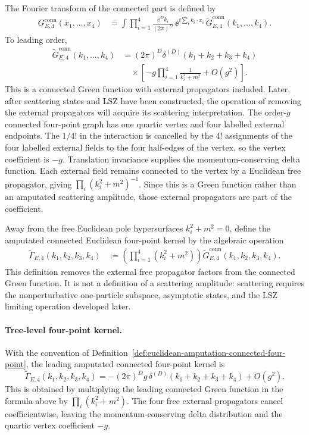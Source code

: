 The Fourier transform of the connected part is defined by
\[
\begin{aligned}
  G_{E,4}^{\mathrm{conn}}(x_1,\ldots,x_4)
  &=
  \int
  \prod_{i=1}^4 \frac{\dd^D k_i}{(2\pi)^D}\,
  \ee^{\ii\sum_i k_i\cdot x_i}\,
  \widetilde G_{E,4}^{\mathrm{conn}}(k_1,\ldots,k_4).
\end{aligned}
\]
To leading order,
\[
\begin{aligned}
  \widetilde G_{E,4}^{\mathrm{conn}}(k_1,\ldots,k_4)
  &=
  (2\pi)^D\delta^{(D)}(k_1+k_2+k_3+k_4)
  \\
  &\quad\times
  \left[
    -g\prod_{i=1}^4 \frac{1}{k_i^2+m^2}
    +O(g^2)
  \right].
\end{aligned}
\]
This is a connected Green function with external propagators included. Later,
after scattering states and LSZ have been constructed, the operation of
removing the external propagators will acquire its scattering interpretation.
The order-\(g\) connected four-point graph has one quartic vertex and four
labelled external endpoints.  The \(1/4!\) in the interaction is cancelled by
the \(4!\) assignments of the four labelled external fields to the four
half-edges of the vertex, so the vertex coefficient is \(-g\).  Translation
invariance supplies the momentum-conserving delta function.  Each external
field remains connected to the vertex by a Euclidean free propagator, giving
\(\prod_i(k_i^2+m^2)^{-1}\).  Since this is a Green function rather than an
amputated scattering amplitude, those external propagators are part of the
coefficient.

\begin{definition}
\label{def:euclidean-amputation-connected-four-point}
Away from the free Euclidean pole hypersurfaces \(k_i^2+m^2=0\), define the
amputated connected Euclidean four-point kernel by the algebraic operation
\[
\begin{aligned}
  \widetilde\Gamma_{E,4}(k_1,k_2,k_3,k_4)
  &:=
  \left(\prod_{i=1}^4(k_i^2+m^2)\right)
  \widetilde G_{E,4}^{\mathrm{conn}}(k_1,k_2,k_3,k_4).
\end{aligned}
\]
This definition removes the external free propagator factors from the
connected Green function.  It is not a definition of a scattering amplitude:
scattering requires the nonperturbative one-particle subspace, asymptotic
states, and the LSZ limiting operation developed later.
\end{definition}

\paragraph{Tree-level four-point kernel.}
With the convention of
Definition~\ref{def:euclidean-amputation-connected-four-point}, the leading
amputated connected four-point kernel is
\[
  \widetilde\Gamma_{E,4}(k_1,k_2,k_3,k_4)
  =
  -(2\pi)^D g\,\delta^{(D)}(k_1+k_2+k_3+k_4)
  +O(g^2).
\]
This is obtained by multiplying the leading connected Green function in the
formula above by \(\prod_i(k_i^2+m^2)\).  The four free external propagators
cancel coefficientwise, leaving the momentum-conserving delta distribution
and the quartic vertex coefficient \(-g\).
